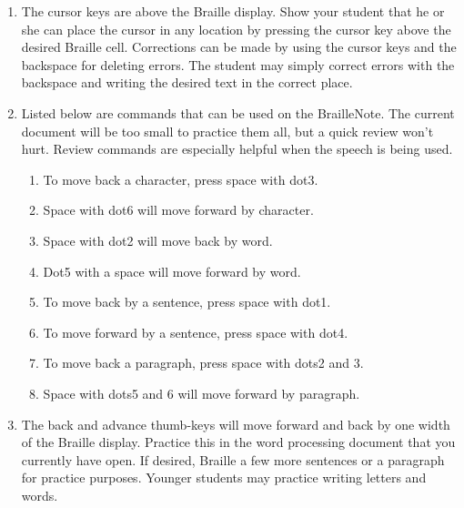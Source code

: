 \documentclass[10pt,letterpaper,twoside]{report}
\begin{document}
{{{{\begin{enumerate}
	\item The cursor keys are above the Braille display.  Show your student that he or she can place the cursor in any location by pressing the cursor key above the desired Braille cell.  Corrections can be made by using the cursor keys and the backspace for deleting errors.  The student may simply correct errors with the backspace and writing the desired text in the correct place.
	      
	\item Listed below are commands that can be used on the BrailleNote.  The current document will be too small to practice them all, but a quick review won't hurt.  Review commands are especially helpful when the speech is being used.
	      
	      \begin{enumerate}
		      \item To move back a character, press space with dot3.
		            
		      \item Space with dot6 will move forward by character.
		            
		      \item Space with dot2 will move back by word.
		            
		      \item Dot5 with a space will move forward by word.
		            
		      \item To move back by a sentence, press space with dot1.
		            
		      \item To move forward by a sentence, press space with dot4.
		            
		      \item To move back a paragraph, press space with dots2 and 3.
		            
		      \item Space with dots5 and 6 will move forward by paragraph.
		            
		            
	      \end{enumerate}
	\item The back and advance thumb-keys will move forward and back by one width of the Braille display.  Practice this in the word processing document that you currently have open.  If desired, Braille a few more sentences or a paragraph for practice purposes. Younger students may practice writing letters and words.
	      

\end{enumerate}}}}}
\end{document}
